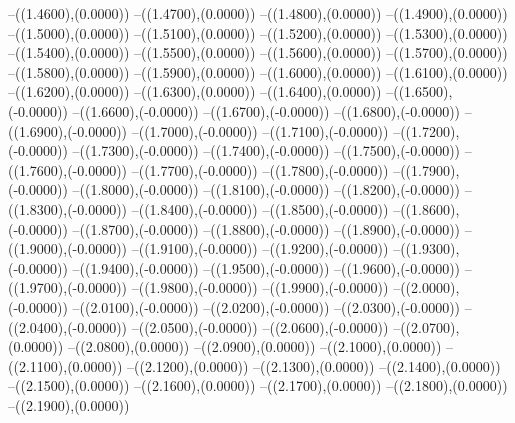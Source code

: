 {	--({\sx*(1.4600)},{\sy*(0.0000)})
	--({\sx*(1.4700)},{\sy*(0.0000)})
	--({\sx*(1.4800)},{\sy*(0.0000)})
	--({\sx*(1.4900)},{\sy*(0.0000)})
	--({\sx*(1.5000)},{\sy*(0.0000)})
	--({\sx*(1.5100)},{\sy*(0.0000)})
	--({\sx*(1.5200)},{\sy*(0.0000)})
	--({\sx*(1.5300)},{\sy*(0.0000)})
	--({\sx*(1.5400)},{\sy*(0.0000)})
	--({\sx*(1.5500)},{\sy*(0.0000)})
	--({\sx*(1.5600)},{\sy*(0.0000)})
	--({\sx*(1.5700)},{\sy*(0.0000)})
	--({\sx*(1.5800)},{\sy*(0.0000)})
	--({\sx*(1.5900)},{\sy*(0.0000)})
	--({\sx*(1.6000)},{\sy*(0.0000)})
	--({\sx*(1.6100)},{\sy*(0.0000)})
	--({\sx*(1.6200)},{\sy*(0.0000)})
	--({\sx*(1.6300)},{\sy*(0.0000)})
	--({\sx*(1.6400)},{\sy*(0.0000)})
	--({\sx*(1.6500)},{\sy*(-0.0000)})
	--({\sx*(1.6600)},{\sy*(-0.0000)})
	--({\sx*(1.6700)},{\sy*(-0.0000)})
	--({\sx*(1.6800)},{\sy*(-0.0000)})
	--({\sx*(1.6900)},{\sy*(-0.0000)})
	--({\sx*(1.7000)},{\sy*(-0.0000)})
	--({\sx*(1.7100)},{\sy*(-0.0000)})
	--({\sx*(1.7200)},{\sy*(-0.0000)})
	--({\sx*(1.7300)},{\sy*(-0.0000)})
	--({\sx*(1.7400)},{\sy*(-0.0000)})
	--({\sx*(1.7500)},{\sy*(-0.0000)})
	--({\sx*(1.7600)},{\sy*(-0.0000)})
	--({\sx*(1.7700)},{\sy*(-0.0000)})
	--({\sx*(1.7800)},{\sy*(-0.0000)})
	--({\sx*(1.7900)},{\sy*(-0.0000)})
	--({\sx*(1.8000)},{\sy*(-0.0000)})
	--({\sx*(1.8100)},{\sy*(-0.0000)})
	--({\sx*(1.8200)},{\sy*(-0.0000)})
	--({\sx*(1.8300)},{\sy*(-0.0000)})
	--({\sx*(1.8400)},{\sy*(-0.0000)})
	--({\sx*(1.8500)},{\sy*(-0.0000)})
	--({\sx*(1.8600)},{\sy*(-0.0000)})
	--({\sx*(1.8700)},{\sy*(-0.0000)})
	--({\sx*(1.8800)},{\sy*(-0.0000)})
	--({\sx*(1.8900)},{\sy*(-0.0000)})
	--({\sx*(1.9000)},{\sy*(-0.0000)})
	--({\sx*(1.9100)},{\sy*(-0.0000)})
	--({\sx*(1.9200)},{\sy*(-0.0000)})
	--({\sx*(1.9300)},{\sy*(-0.0000)})
	--({\sx*(1.9400)},{\sy*(-0.0000)})
	--({\sx*(1.9500)},{\sy*(-0.0000)})
	--({\sx*(1.9600)},{\sy*(-0.0000)})
	--({\sx*(1.9700)},{\sy*(-0.0000)})
	--({\sx*(1.9800)},{\sy*(-0.0000)})
	--({\sx*(1.9900)},{\sy*(-0.0000)})
	--({\sx*(2.0000)},{\sy*(-0.0000)})
	--({\sx*(2.0100)},{\sy*(-0.0000)})
	--({\sx*(2.0200)},{\sy*(-0.0000)})
	--({\sx*(2.0300)},{\sy*(-0.0000)})
	--({\sx*(2.0400)},{\sy*(-0.0000)})
	--({\sx*(2.0500)},{\sy*(-0.0000)})
	--({\sx*(2.0600)},{\sy*(-0.0000)})
	--({\sx*(2.0700)},{\sy*(0.0000)})
	--({\sx*(2.0800)},{\sy*(0.0000)})
	--({\sx*(2.0900)},{\sy*(0.0000)})
	--({\sx*(2.1000)},{\sy*(0.0000)})
	--({\sx*(2.1100)},{\sy*(0.0000)})
	--({\sx*(2.1200)},{\sy*(0.0000)})
	--({\sx*(2.1300)},{\sy*(0.0000)})
	--({\sx*(2.1400)},{\sy*(0.0000)})
	--({\sx*(2.1500)},{\sy*(0.0000)})
	--({\sx*(2.1600)},{\sy*(0.0000)})
	--({\sx*(2.1700)},{\sy*(0.0000)})
	--({\sx*(2.1800)},{\sy*(0.0000)})
	--({\sx*(2.1900)},{\sy*(0.0000)})
}
